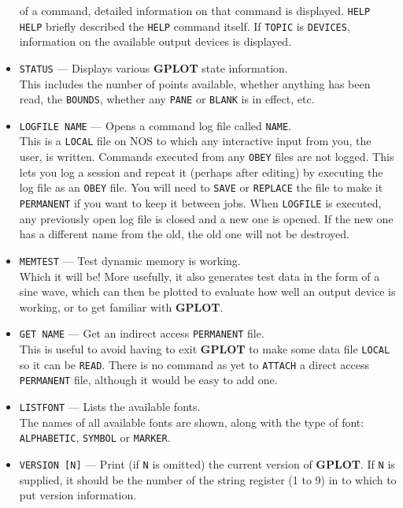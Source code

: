 \documentclass[a4paper,twoside,11pt]{article}
\newcommand{\textttc}[1]{\texttt{\textcolor{OurRed}{#1}}}
\begin{document}
\begin{itemize}
   of a command, detailed information on that command is displayed. \texttt{HELP HELP} briefly described the \texttt{HELP} command
   itself. If \texttt{TOPIC} is \texttt{DEVICES}, information on the available output devices is displayed.
\item \textttc{STATUS} --- Displays various \textbf{GPLOT} state information.\\
   This includes the number of points available, whether anything has been read, the \texttt{BOUNDS}, whether
   any \texttt{PANE} or \texttt{BLANK} is in effect, etc.
\item \textttc{LOGFILE NAME} --- Opens a command log file called \texttt{NAME}.\\
   This is a \texttt{LOCAL} file on NOS to which any interactive input from you, the user, is written. Commands executed
   from any \texttt{OBEY} files are not logged. This lets you log a session and repeat it (perhaps after editing)
   by executing the log file as an \texttt{OBEY} file. You will need to \texttt{SAVE} or \texttt{REPLACE} the file to make it
   \texttt{PERMANENT} if you want to keep it between jobs. When \texttt{LOGFILE} is executed, any previously open log file
   is closed and a new one is opened. If the new one has a different name from the old, the old one will
   not be destroyed.
\item \textttc{MEMTEST} --- Test dynamic memory is working.\\
   Which it will be! More usefully, it also generates test data in the form of a sine wave, which can then
   be plotted to evaluate how well an output device is working, or to get familiar with \textbf{GPLOT}.
\item \textttc{GET NAME} --- Get an indirect access \texttt{PERMANENT} file.\\
   This is useful to avoid having to exit \textbf{GPLOT} to make some data file \texttt{LOCAL} so it can be \texttt{READ}.
   There is no command as yet to \texttt{ATTACH} a direct access \texttt{PERMANENT} file, although it would be easy
   to add one.
\item \textttc{LISTFONT} --- Lists the available fonts.\\
	The names of all available fonts are shown, along with the type of font: \texttt{ALPHABETIC}, \texttt{SYMBOL} or 
	\texttt{MARKER}.
\item \textttc{VERSION [N]} --- Print (if \texttt{N} is omitted) the current version of \textbf{GPLOT}.
        If \texttt{N} is supplied, it should be the
        number of the string register (1 to 9) in to which to put version information.

\end{itemize}
\end{document}
